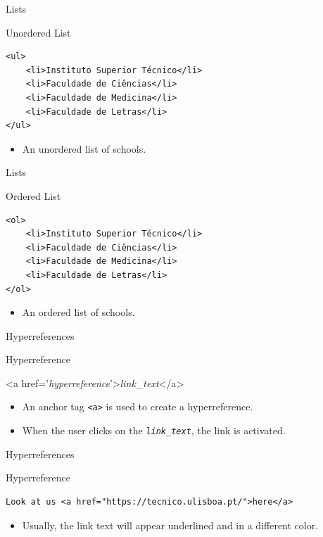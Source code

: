 \documentclass[svgnames]{beamer}
\begin{document}
\begin{frame}[fragile]{Lists}
\small
\begin{block}{Unordered List}
\begin{verbatim}
<ul>
    <li>Instituto Superior Técnico</li>
    <li>Faculdade de Ciências</li>
    <li>Faculdade de Medicina</li>
    <li>Faculdade de Letras</li>
</ul>
\end{verbatim}
\end{block}
\normalsize
\begin{itemize}
	\item An unordered list of schools.
\end{itemize}
\end{frame}

\begin{frame}[fragile]{Lists}
\small
\begin{block}{Ordered List}
\begin{verbatim}
<ol>
    <li>Instituto Superior Técnico</li>
    <li>Faculdade de Ciências</li>
    <li>Faculdade de Medicina</li>
    <li>Faculdade de Letras</li>
</ol>
\end{verbatim}
\end{block}
\normalsize
\begin{itemize}
	\item An ordered list of schools.
\end{itemize}
\end{frame}

\begin{frame}[fragile]{Hyperreferences}
\small
\begin{block}{Hyperreference}
\begin{semiverbatim}
<a href='\emph{hyperreference}'>\textit{link\_text}</a>
\end{semiverbatim}
\end{block}
\normalsize
\begin{itemize}
	\item An anchor tag \texttt{<a>} is used to create a hyperreference.
	\item When the user clicks on the \texttt{\textit{link\_text}}, the link is activated.
\end{itemize}
\end{frame}

\begin{frame}[fragile]{Hyperreferences}
\scriptsize
\begin{block}{Hyperreference}
\begin{verbatim}
Look at us <a href="https://tecnico.ulisboa.pt/">here</a>
\end{verbatim}
\end{block}
\normalsize
\begin{itemize}
	\item Usually, the link text will appear underlined and in a different color.
\end{itemize}
\end{frame}
\end{document}
